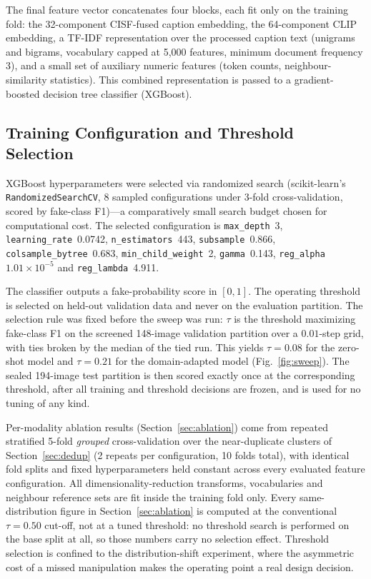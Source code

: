 \documentclass[conference,a4paper]{IEEEtran}
\begin{document}
The final feature vector concatenates four blocks, each fit only on the
training fold: the 32-component CISF-fused caption embedding, the 64-component
CLIP embedding, a TF-IDF representation over the processed caption text
(unigrams and bigrams, vocabulary capped at 5{,}000 features, minimum document
frequency 3), and a small set of auxiliary numeric features (token counts,
neighbour-similarity statistics). This combined representation is passed to a
gradient-boosted decision tree classifier (XGBoost).

\subsection{Training Configuration and Threshold Selection}
\label{sec:training}

XGBoost hyperparameters were selected via randomized search (scikit-learn's
\texttt{RandomizedSearchCV}, 8 sampled configurations under 3-fold
cross-validation, scored by fake-class F1)---a comparatively small search
budget chosen for computational cost. The selected configuration is
\texttt{max\_depth}~3, \texttt{learning\_rate}~0.0742,
\texttt{n\_estimators}~443, \texttt{subsample}~0.866,
\texttt{colsample\_bytree}~0.683, \texttt{min\_child\_weight}~2,
\texttt{gamma}~0.143, \texttt{reg\_alpha}~$1.01\times10^{-5}$ and
\texttt{reg\_lambda}~4.911.

The classifier outputs a fake-probability score in $[0,1]$. The operating
threshold is selected on held-out validation data and never on the evaluation
partition. The selection rule was fixed before the sweep was run: $\tau$ is
the threshold maximizing fake-class F1 on the screened 148-image validation
partition over a $0.01$-step grid, with ties broken by the median of the tied
run. This yields $\tau = 0.08$ for the zero-shot model and $\tau = 0.21$ for
the domain-adapted model (Fig.~\ref{fig:sweep}). The sealed 194-image test
partition is then scored exactly once at the corresponding threshold, after
all training and threshold decisions are frozen, and is used for no tuning of
any kind.

Per-modality ablation results (Section~\ref{sec:ablation}) come from repeated
stratified 5-fold \emph{grouped} cross-validation over the near-duplicate
clusters of Section~\ref{sec:dedup} (2 repeats per configuration, 10 folds
total), with identical fold splits and fixed hyperparameters held constant
across every evaluated feature configuration. All dimensionality-reduction
transforms, vocabularies and neighbour reference sets are fit inside the
training fold only. Every same-distribution figure in
Section~\ref{sec:ablation} is computed at the conventional $\tau = 0.50$
cut-off, not at a tuned threshold: no threshold search is performed on the
base split at all, so those numbers carry no selection effect. Threshold
selection is confined to the distribution-shift experiment, where the
asymmetric cost of a missed manipulation makes the operating point a real
design decision.
\end{document}
